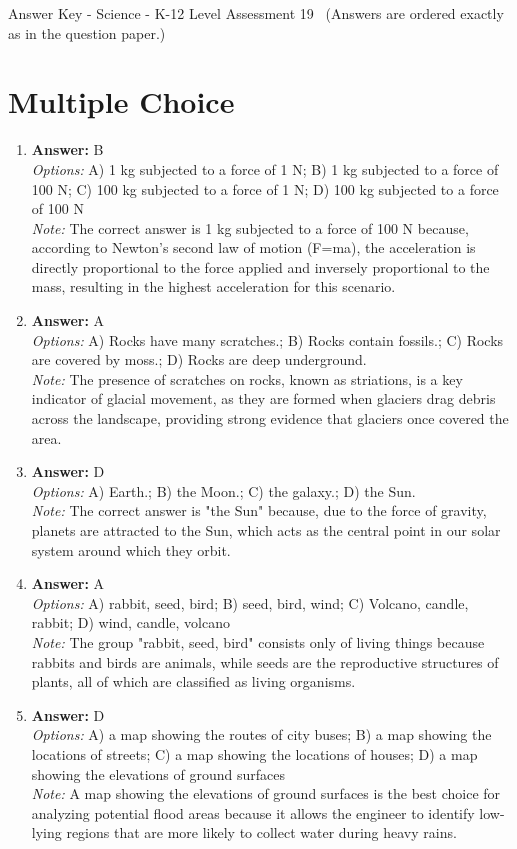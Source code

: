 \documentclass[12pt]{article}
\begin{document}
\begin{center}
Answer Key - Science - K-12 Level Assessment 19 \
\small (Answers are ordered exactly as in the question paper.)
\end{center}

\section*{Multiple Choice}
\begin{enumerate}[label=\arabic*.]
\item \textbf{Answer:} B
\\ \textit{Options:} A) 1 kg subjected to a force of 1 N; B) 1 kg subjected to a force of 100 N; C) 100 kg subjected to a force of 1 N; D) 100 kg subjected to a force of 100 N
\\ \textit{Note:} The correct answer is 1 kg subjected to a force of 100 N because, according to Newton's second law of motion (F=ma), the acceleration is directly proportional to the force applied and inversely proportional to the mass, resulting in the highest acceleration for this scenario.
\item \textbf{Answer:} A
\\ \textit{Options:} A) Rocks have many scratches.; B) Rocks contain fossils.; C) Rocks are covered by moss.; D) Rocks are deep underground.
\\ \textit{Note:} The presence of scratches on rocks, known as striations, is a key indicator of glacial movement, as they are formed when glaciers drag debris across the landscape, providing strong evidence that glaciers once covered the area.
\item \textbf{Answer:} D
\\ \textit{Options:} A) Earth.; B) the Moon.; C) the galaxy.; D) the Sun.
\\ \textit{Note:} The correct answer is "the Sun" because, due to the force of gravity, planets are attracted to the Sun, which acts as the central point in our solar system around which they orbit.
\item \textbf{Answer:} A
\\ \textit{Options:} A) rabbit, seed, bird; B) seed, bird, wind; C) Volcano, candle, rabbit; D) wind, candle, volcano
\\ \textit{Note:} The group "rabbit, seed, bird" consists only of living things because rabbits and birds are animals, while seeds are the reproductive structures of plants, all of which are classified as living organisms.
\item \textbf{Answer:} D
\\ \textit{Options:} A) a map showing the routes of city buses; B) a map showing the locations of streets; C) a map showing the locations of houses; D) a map showing the elevations of ground surfaces
\\ \textit{Note:} A map showing the elevations of ground surfaces is the best choice for analyzing potential flood areas because it allows the engineer to identify low-lying regions that are more likely to collect water during heavy rains.
\end{enumerate}
\end{document}
